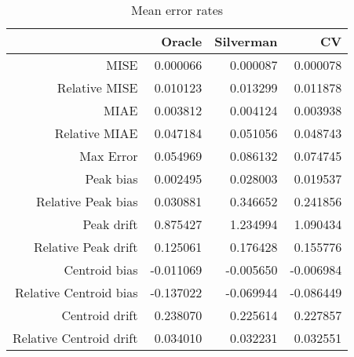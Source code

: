 \begin{table}[ht]
\centering
\begin{tabular}{rrrr}
  \hline
 & Oracle & Silverman & CV \\ 
  \hline
MISE & 0.000066 & 0.000087 & 0.000078 \\ 
  Relative MISE & 0.010123 & 0.013299 & 0.011878 \\ 
  MIAE & 0.003812 & 0.004124 & 0.003938 \\ 
  Relative MIAE & 0.047184 & 0.051056 & 0.048743 \\ 
  Max Error & 0.054969 & 0.086132 & 0.074745 \\ 
  Peak bias & 0.002495 & 0.028003 & 0.019537 \\ 
  Relative Peak bias & 0.030881 & 0.346652 & 0.241856 \\ 
  Peak drift & 0.875427 & 1.234994 & 1.090434 \\ 
  Relative Peak drift & 0.125061 & 0.176428 & 0.155776 \\ 
  Centroid bias & -0.011069 & -0.005650 & -0.006984 \\ 
  Relative Centroid bias & -0.137022 & -0.069944 & -0.086449 \\ 
  Centroid drift & 0.238070 & 0.225614 & 0.227857 \\ 
  Relative Centroid drift & 0.034010 & 0.032231 & 0.032551 \\ 
   \hline
\end{tabular}
\caption{Mean error rates} 
\label{tbl:mean_error_rates}
\end{table}
